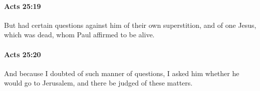 		\paragraph{Acts 25:19} %
			\label{ACTS-25-19}

			But had certain questions against him of their own superstition, and of one Jesus, which was dead, whom Paul affirmed to be alive.

			\begin{framed}
			\scriptsize
				\begin{compactdesc}
					\item[SBLG] 
				\end{compactdesc}
			\end{framed}

		\paragraph{Acts 25:20} %
			\label{ACTS-25-20}

			And because I doubted of such manner of questions, I asked him whether he would go to Jerusalem, and there be judged of these matters.

